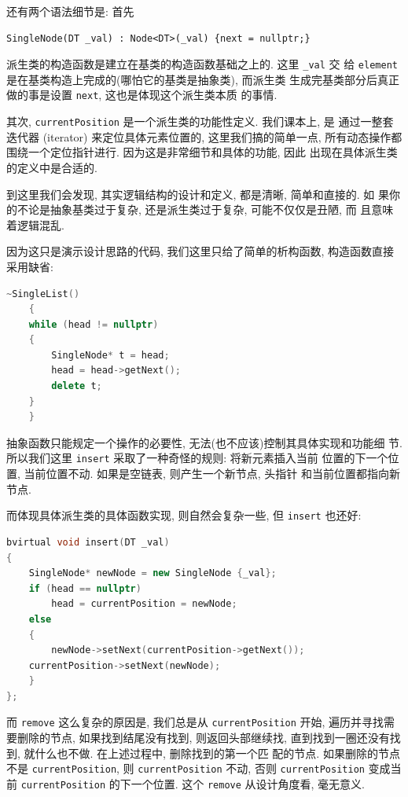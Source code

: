 \documentclass[a4paper]{ctexart}
\theoremstyle{definition}
\theoremstyle{definition}
\begin{document}
还有两个语法细节是: 首先
\begin{verbatim}
SingleNode(DT _val) : Node<DT>(_val) {next = nullptr;}
\end{verbatim}

派生类的构造函数是建立在基类的构造函数基础之上的. 这里 \verb|_val| 交
给 \verb|element| 是在基类构造上完成的(哪怕它的基类是抽象类), 而派生类
生成完基类部分后真正做的事是设置 \verb|next|, 这也是体现这个派生类本质
的事情.

其次, \verb|currentPosition| 是一个派生类的功能性定义. 我们课本上, 是
通过一整套迭代器 (iterator) 来定位具体元素位置的, 这里我们搞的简单一点,
所有动态操作都围绕一个定位指针进行. 因为这是非常细节和具体的功能, 因此
出现在具体派生类的定义中是合适的. 

到这里我们会发现, 其实逻辑结构的设计和定义, 都是清晰, 简单和直接的. 如
果你的不论是抽象基类过于复杂, 还是派生类过于复杂, 可能不仅仅是丑陋, 而
且意味着逻辑混乱.

因为这只是演示设计思路的代码, 我们这里只给了简单的析构函数, 构造函数直接采用缺省:
\begin{lstlisting}[language=C++]
    ~SingleList()
    {
	while (head != nullptr)
	{
	    SingleNode* t = head;
	    head = head->getNext();
	    delete t;
	}
    }
\end{lstlisting}

抽象函数只能规定一个操作的必要性, 无法(也不应该)控制其具体实现和功能细
节. 所以我们这里 \verb|insert| 采取了一种奇怪的规则: 将新元素插入当前
位置的下一个位置, 当前位置不动. 如果是空链表, 则产生一个新节点, 头指针
和当前位置都指向新节点. 

而体现具体派生类的具体函数实现, 则自然会复杂一些, 但 \verb|insert| 也还好:

\begin{lstlisting}[language=C++]
bvirtual void insert(DT _val)
{
    SingleNode* newNode = new SingleNode {_val};
    if (head == nullptr)
        head = currentPosition = newNode;
    else
    {
        newNode->setNext(currentPosition->getNext());
	currentPosition->setNext(newNode);
    }
};
\end{lstlisting}

而 \verb|remove| 这么复杂的原因是, 我们总是从 \verb|currentPosition|
开始, 遍历并寻找需要删除的节点, 如果找到结尾没有找到, 则返回头部继续找,
直到找到一圈还没有找到, 就什么也不做. 在上述过程中, 删除找到的第一个匹
配的节点. 如果删除的节点不是 \verb|currentPosition|, 则
\verb|currentPosition| 不动, 否则 \verb|currentPosition| 变成当前
\verb|currentPosition| 的下一个位置. 这个 \verb|remove| 从设计角度看,
毫无意义.
\end{document}
